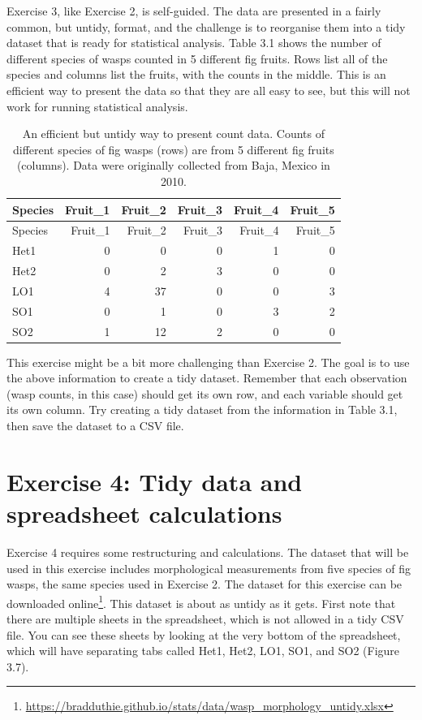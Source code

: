 \documentclass[
]{scrbook}
\begin{document}
Exercise 3, like Exercise 2, is self-guided.
The data are presented in a fairly common, but untidy, format, and the challenge is to reorganise them into a tidy dataset that is ready for statistical analysis.
Table 3.1 shows the number of different species of wasps counted in 5 different fig fruits.
Rows list all of the species and columns list the fruits, with the counts in the middle.
This is an efficient way to present the data so that they are all easy to see, but this will not work for running statistical analysis.

\begin{longtable}[]{@{}lrrrrr@{}}
\caption{\label{tab:unnamed-chunk-16}An efficient but untidy way to present count data. Counts of different species of fig wasps (rows) are from 5 different fig fruits (columns). Data were originally collected from Baja, Mexico in 2010.}\tabularnewline
\toprule
Species & Fruit\_1 & Fruit\_2 & Fruit\_3 & Fruit\_4 & Fruit\_5 \\
\midrule
\endfirsthead
\toprule
Species & Fruit\_1 & Fruit\_2 & Fruit\_3 & Fruit\_4 & Fruit\_5 \\
\midrule
\endhead
Het1 & 0 & 0 & 0 & 1 & 0 \\
Het2 & 0 & 2 & 3 & 0 & 0 \\
LO1 & 4 & 37 & 0 & 0 & 3 \\
SO1 & 0 & 1 & 0 & 3 & 2 \\
SO2 & 1 & 12 & 2 & 0 & 0 \\
\bottomrule
\end{longtable}

This exercise might be a bit more challenging than Exercise 2.
The goal is to use the above information to create a tidy dataset.
Remember that each observation (wasp counts, in this case) should get its own row, and each variable should get its own column.
Try creating a tidy dataset from the information in Table 3.1, then save the dataset to a CSV file.

\hypertarget{exercise-4-tidy-data-and-spreadsheet-calculations}{%
\section{Exercise 4: Tidy data and spreadsheet calculations}\label{exercise-4-tidy-data-and-spreadsheet-calculations}}

Exercise 4 requires some restructuring and calculations.
The dataset that will be used in this exercise includes morphological measurements from five species of fig wasps, the same species used in Exercise 2.
The dataset for this exercise can be downloaded online\footnote{\url{https://bradduthie.github.io/stats/data/wasp_morphology_untidy.xlsx}}.
This dataset is about as untidy as it gets.
First note that there are multiple sheets in the spreadsheet, which is not allowed in a tidy CSV file.
You can see these sheets by looking at the very bottom of the spreadsheet, which will have separating tabs called Het1, Het2, LO1, SO1, and SO2 (Figure 3.7).
\end{document}
